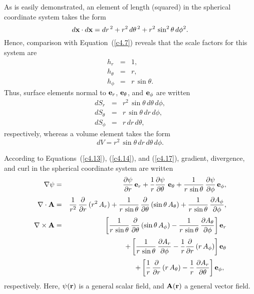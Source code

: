  As is easily demonstrated,  an element of length (squared) in the spherical coordinate system takes the form
\begin{equation}
d {\bf x}\cdot d{\bf x} = dr^{\,2} + r^2\,d\theta^{\,2} + r^2\,\sin^2\theta\,d\phi^2.
\end{equation}
Hence,  comparison with Equation~(\ref{c4.7}) reveals that the scale factors for this system are
\begin{eqnarray}
h_r &=& 1,\\[0.5ex]
h_\theta &=& r,\\[0.5ex]
h_\phi &=& r\,\sin\theta.
\end{eqnarray}
Thus,  surface elements normal to ${\bf e}_r$, ${\bf e}_\theta$, and ${\bf e}_\phi$ are
written
\begin{eqnarray}
dS_r& =& r^2\,\sin\theta\,d\theta\,d\phi,\\[0.5ex]
dS_\theta &=& r\,\sin\theta\,dr\,d\phi,\\[0.5ex]
dS_\phi &=& r\,dr\,d\theta,
\end{eqnarray}
respectively, whereas  
a
volume element takes the form
\begin{equation}
dV = r^2\,\sin\theta\,dr\,d\theta\,d\phi.
\end{equation}
 
 According to Equations~(\ref{c4.13}), (\ref{c4.14}), and (\ref{c4.17}), gradient, divergence, and curl in the spherical
 coordinate system  are written
 \begin{eqnarray}
\nabla \psi &=& \frac{\partial \psi}{\partial r}\,{\bf e}_r
+ \frac{1}{r}\frac{\partial \psi}{\partial\theta}\,\,{\bf e}_\theta
+ \frac{1}{r\,\sin\theta}\,\frac{\partial \psi}{\partial \phi}\,{\bf e}_\phi,\\[0.5ex]
\nabla\cdot {\bf A} &=&\frac{1}{r^2}\,\frac{\partial}{\partial r}\,(r^2\,A_r) + \frac{1}{r\,\sin\theta}\,\frac{\partial }{\partial\theta} \,(\sin\theta\,A_\theta)+ \frac{1}{r\,\sin\theta}\,\frac{\partial A_\phi}{\partial \phi},\label{ec65}\\[0.5ex]
\nabla\times{\bf A} &=& \left[\frac{1}{r\,\sin\theta}\,\frac{\partial}{\partial \theta}\,(\sin\theta \,A_\phi)-\frac{1}{r\,\sin\theta}\,\frac{\partial A_\theta}{\partial \phi}\right]{\bf e}_r\nonumber\\[0.5ex]
&&+\left[\frac{1}{r\,\sin\theta}\,\frac{\partial A_r}{\partial \phi}-\frac{1}{r}\frac{\partial}{\partial r}\,(r\,A_\phi)\right]{\bf e}_\theta\nonumber\\[0.5ex]
&&+ \left[\frac{1}{r}\,\frac{\partial}{\partial r}\,(r\,A_\theta) - \frac{1}{r}\,\frac{\partial A_r}{\partial\theta}\right]{\bf e}_\phi,\
\end{eqnarray}
respectively. Here, $\psi({\bf r})$ is a general scalar field, and ${\bf A}({\bf r})$ a general vector field. 

